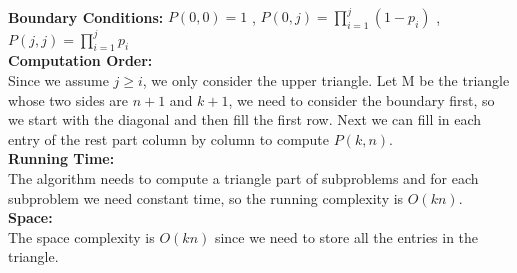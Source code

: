 \documentclass[twoside]{homework}
\begin{document}
\\\textbf{Boundary Conditions:} 
$P(0,0)=1$ , $P(0,j)=\prod_{i=1}^{j}(1-p_i)$ , $P(j,j)=\prod_{i=1}^{j}p_i$
\\\textbf{Computation Order:} 
\\Since we assume $j\ge i$, we only consider the upper triangle. Let M be the triangle whose two sides are $n+1$ and $k+1$, we need to consider the boundary first, so we start with the diagonal and then fill the first row. Next we can fill in each entry of the rest part column by column to compute $P(k,n)$.
\\\textbf{Running Time:} \quad
\\The algorithm needs to compute a triangle part of subproblems and for each subproblem we need constant time, so the running complexity is $O(kn)$.
\\\textbf{Space:} \quad
\\The space complexity is $O(kn)$ since we need to store all the entries in the triangle.
\end{document}
